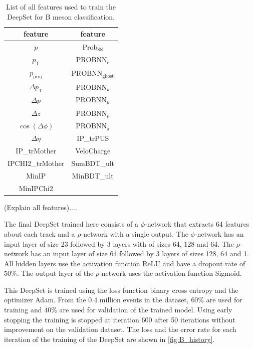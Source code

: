 \begin{table}
    \centering
    \caption{List of all features used to train the DeepSet for B meson classification.}
    \label{tab:B_features}
    \begin{tabular}{c c}
        \toprule
        feature & feature \\
        \midrule
        $p$                 & $\text{Prob}_\text{SS}$ \\ %
        $p_\text{T}$        & $\text{PROBNN}_e$ \\ %
        $p_\text{proj}$     & $\text{PROBNN}_\text{ghost}$ \\ %
        $\Delta p_\text{T}$ & $\text{PROBNN}_k$ \\ %
        $\Delta p$          & $\text{PROBNN}_\mu$ \\ %
        $\Delta z$          & $\text{PROBNN}_p$ \\ %
        $\cos(\Delta \phi)$ & $\text{PROBNN}_\pi$ \\ %
        $\Delta \eta$       & IP\_trPUS \\ %
        IP\_trMother        & VeloCharge \\ %
        IPCHI2\_trMother    & SumBDT\_ult \\ %
        MinIP               & MinBDT\_ult \\ %
        MinIPChi2           & \\ %
        \bottomrule
    \end{tabular}
\end{table}

(Explain all features)....

The final DeepSet trained here consists of a $\phi$-network that extracts 64 features about each track and a $\rho$-network with a single output.
The $\phi$-network has an input layer of size 23 followed by 3 layers with of sizes 64, 128 and 64.
The $\rho$-network has an input layer of size 64 followed by 3 layers of sizes 128, 64 and 1.
All hidden layers use the activation function ReLU and have a dropout rate of $50\%$.
The output layer of the $\rho$-network uses the activation function Sigmoid.

This DeepSet is trained using the loss function binary cross entropy and the optimizer Adam.
From the $0.4$ million events in the dataset, $60\%$ are used for training and $40\%$ are used for validation of the trained model.
Using early stopping the training is stopped at iteration 600 after 50 iterations without improvement on the validation dataset.
The loss and the error rate for each iteration of the training of the DeepSet are shown in \autoref{fig:B_history}.

